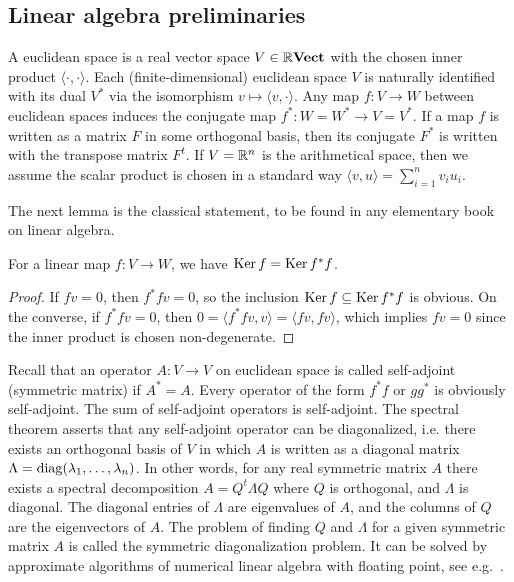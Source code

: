 \subsection{Linear algebra preliminaries}\label{subsecMathLinAlg}

A euclidean space is a real vector space $V\in\mathbb{R}\mathbf{Vect}$ with the chosen inner product $\langle\cdot,\cdot\rangle$. Each (finite-dimensional) euclidean space $V$ is naturally identified with its dual $V^*$ via the isomorphism $v\mapsto \langle v,\cdot\rangle$. Any map $f\colon V\to W$ between euclidean spaces induces the conjugate map $f^*\colon W=W^*\to V=V^*$. If a map $f$ is written as a matrix $F$ in some orthogonal basis, then its conjugate $F^*$ is written with the transpose matrix $F^t$. If $V=\mathbb{R}^n$ is the arithmetical space, then we assume the scalar product is chosen in a standard way $\langle v,u\rangle=\sum_{i=1}^{n}v_iu_i$.

The next lemma is the classical statement, to be found in any elementary book on linear algebra.

\begin{lem}\label{lemKerFFisKerF}
For a linear map $f\colon V\to W$, we have $\operatorname{Ker} f=\operatorname{Ker} f^*f$.
\end{lem}

\begin{proof}
If $fv=0$, then $f^*fv=0$, so the inclusion $\operatorname{Ker} f\subseteq\operatorname{Ker} f^*f$ is obvious. On the converse, if $f^*fv=0$, then
$0=\langle f^*fv,v\rangle=\langle fv,fv\rangle$, which implies $fv=0$ since the inner product is chosen non-degenerate.
\end{proof}

\begin{con}\label{conSelfAdjoint}
Recall that an operator $A\colon V\to V$ on euclidean space is called self-adjoint (symmetric matrix) if $A^*=A$. Every operator of the form $f^*f$ or $gg^*$ is obviously self-adjoint. The sum of self-adjoint operators is self-adjoint. The spectral theorem asserts that any self-adjoint operator can be diagonalized, i.e. there exists an orthogonal basis of $V$ in which $A$ is written as a diagonal matrix $\Lambda=\operatorname{diag}(\lambda_1,\ldots,\lambda_n)$. In other words, for any real symmetric matrix $A$ there exists a spectral decomposition $A=Q^t\Lambda Q$ where $Q$ is orthogonal, and $\Lambda$ is diagonal. The diagonal entries of $\Lambda$ are eigenvalues of $A$, and the columns of $Q$ are the eigenvectors of $A$. The problem of finding $Q$ and $\Lambda$ for a given symmetric matrix $A$ is called the symmetric diagonalization problem. It can be solved by approximate algorithms of numerical linear algebra with floating point, see e.g.~\cite{NumLinAlg}.
\end{con}

